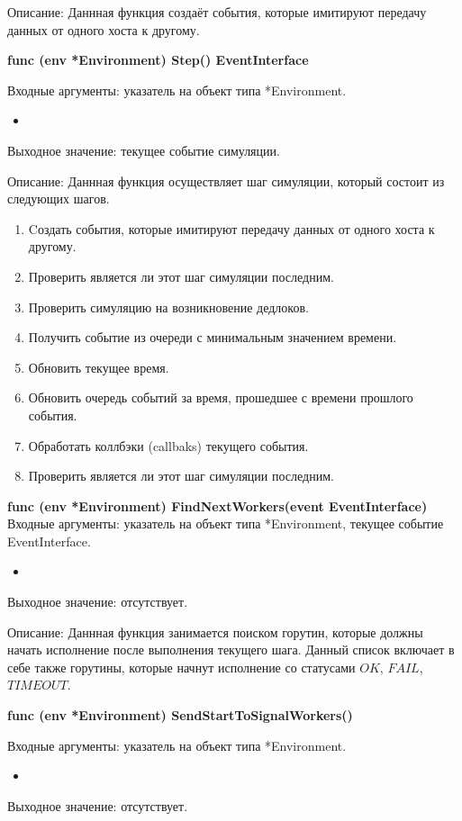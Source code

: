 Описание: Даннная функция создаёт события, которые имитируют передачу данных от одного хоста к другому.

\textbf{func (env *Environment) Step() EventInterface }

Входные аргументы: указатель на объект типа *Environment.
\begin{itemize}
	\item 
\end{itemize}

Выходное значение: текущее событие симуляции.

Описание: Даннная функция осуществляет шаг симуляции, который состоит из следующих шагов. 
\begin{enumerate}
	\item Cоздать события, которые имитируют передачу данных от одного хоста к другому.
	\item Проверить является ли этот шаг симуляции последним.
	\item Проверить симуляцию на возникновение дедлоков.
	\item Получить событие из очереди с минимальным значением времени.
	\item Обновить текущее время.
	\item Обновить очередь событий за время, прошедшее с времени прошлого события.
	\item Обработать коллбэки (callbaks) текущего события.
	\item Проверить является ли этот шаг симуляции последним.
	
\end{enumerate}

\textbf{func (env *Environment) FindNextWorkers(event EventInterface)}
Входные аргументы: указатель на объект типа *Environment, текущее событие EventInterface.
\begin{itemize}
	\item 
\end{itemize}

Выходное значение: отсутствует. 

Описание: Даннная функция занимается поиском горутин, которые должны начать исполнение после выполнения текущего шага. Данный список включает в себе также горутины, которые начнут исполнение со статусами $OK$, $FAIL$, $TIMEOUT$.

\textbf{func (env *Environment) SendStartToSignalWorkers()}

Входные аргументы: указатель на объект типа *Environment.
\begin{itemize}
	\item 
\end{itemize}
Выходное значение: отсутствует. 

